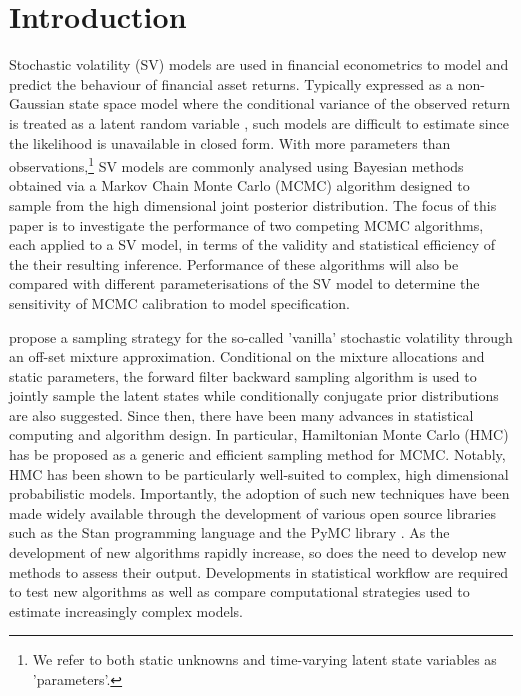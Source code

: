 \documentclass[12pt, a4paper]{article}
\begin{document}
\section{Introduction}
    Stochastic volatility (SV) models are used in financial econometrics to model and predict the behaviour of financial asset returns. Typically expressed as a non-Gaussian state space model where the conditional variance of the observed return is treated as a latent random variable \citep{hull1987pricing, chesney1989pricing}, such models are difficult to estimate since the likelihood is unavailable in closed form. With more parameters than observations,\footnote{We refer to both static unknowns and time-varying latent state variables as 'parameters'.} SV models are commonly analysed using Bayesian methods obtained via a Markov Chain Monte Carlo (MCMC) algorithm designed to sample from the high dimensional joint posterior distribution. The focus of this paper is to investigate the performance of two competing MCMC algorithms, each applied to a SV model, in terms of the validity and statistical efficiency of the their resulting inference. Performance of these algorithms will also be compared with different parameterisations of the SV model to determine the sensitivity of MCMC calibration to model specification.

    \citet{kim1998stochastic} propose a sampling strategy for the so-called 'vanilla' stochastic volatility through an off-set mixture approximation. Conditional on the mixture allocations and static parameters, the forward filter backward sampling algorithm \citep{carter1994gibbs, fruhwirth1995bayesian} is used to jointly sample the latent states while conditionally  conjugate prior distributions are also suggested.  Since then, there have been many advances in statistical computing and algorithm design. In particular, Hamiltonian Monte Carlo (HMC) has be proposed as a generic and efficient sampling method for MCMC. Notably, HMC has been shown to be particularly well-suited to complex, high dimensional probabilistic models. Importantly, the adoption of such new techniques have been made widely available through the development of various open source libraries such as the Stan programming language \citep{stan} and the PyMC library \citep{pymc2023}. As the development of new algorithms rapidly increase, so does the need to develop new methods to assess their output. Developments in statistical workflow are required to test new algorithms as well as compare computational strategies used to estimate increasingly complex models.
\end{document}

